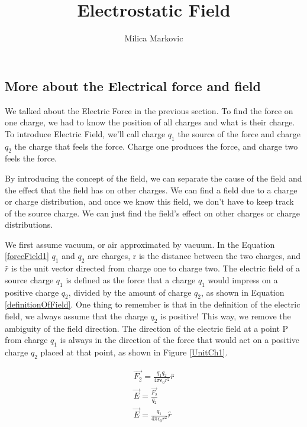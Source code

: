 \documentclass{ximera}
\title{Electrostatic Field}
\author{Milica Markovic}
\begin{document}
  
\begin{abstract}  

\end{abstract}  
\maketitle    




\subsection{More about the Electrical force and field}

We talked about the Electric Force in the previous section. To find the force on one charge, we had to know the position of all charges and what is their charge.  To introduce Electric Field, we'll call charge $q_1$ the source of the force and charge $q_2$ the charge that feels the force. Charge one produces the force, and charge two feels the force. 

By introducing the concept of the field, we can separate the cause of the field and the effect that the field has on other charges. We can find a field due to a charge or charge distribution, and once we know this field, we don't have to keep track of the source charge. We can just find the field's effect on other charges or charge distributions.


 We first assume vacuum, or air approximated by vacuum. In the Equation \ref{forceField1} $q_1$ and $q_2$ are charges, r is the distance between the two charges, and $\hat{r}$ is the unit vector directed  from charge one to charge two. The electric field of a source charge $q_1$ is defined as the force that a charge $q_1$ would impress on a positive charge $q_2$, divided by the amount of charge $q_2$, as shown in Equation \ref{definitionOfField}. One thing to remember is that in the definition of the electric field, we always assume that the charge $q_2$ is positive! This way, we remove the ambiguity of the field direction. The direction of the electric field at a point P from charge $q_1$ is always in the direction of the force that would act on a positive charge $q_2$ placed at that point, as shown in Figure \ref{UnitCh1}.


\begin{eqnarray}
\vec{F_2}=\frac{q_1 q_2}{4 \pi \epsilon_0 r^2 } \hat{r} \label{forceField1}\\
\vec{E} = \frac{\vec{F_2}}{q_2} \label{definitionOfField} \\
\vec{E} =  \frac{q_1}{4 \pi \epsilon_0 r^2} \hat{r} \label{electricfield}
\end{eqnarray} 
\end{document}
